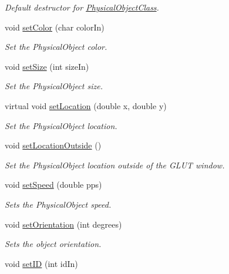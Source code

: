 \begin{DoxyCompactItemize}
\begin{DoxyCompactList}\small\item\em Default destructor for \hyperlink{classPhysicalObjectClass}{Physical\-Object\-Class}. \end{DoxyCompactList}\item 
void \hyperlink{classPhysicalObjectClass_aed8b6e0511dd981e8161eabfc6705be1}{set\-Color} (char color\-In)
\begin{DoxyCompactList}\small\item\em Set the Physical\-Object color. \end{DoxyCompactList}\item 
void \hyperlink{classPhysicalObjectClass_a02c35b30ac5f7c02d006ec0c008d7280}{set\-Size} (int size\-In)
\begin{DoxyCompactList}\small\item\em Set the Physical\-Object size. \end{DoxyCompactList}\item 
virtual void \hyperlink{classPhysicalObjectClass_a3f9833aa04aa438de63b82fc761910ba}{set\-Location} (double x, double y)
\begin{DoxyCompactList}\small\item\em Set the Physical\-Object location. \end{DoxyCompactList}\item 
void \hyperlink{classPhysicalObjectClass_ad80f075cef71fd42587695936a5808fa}{set\-Location\-Outside} ()
\begin{DoxyCompactList}\small\item\em Set the Physical\-Object location outside of the G\-L\-U\-T window. \end{DoxyCompactList}\item 
void \hyperlink{classPhysicalObjectClass_ab8315565f193dd26f7069480d820a7c9}{set\-Speed} (double pps)
\begin{DoxyCompactList}\small\item\em Sets the Physical\-Object speed. \end{DoxyCompactList}\item 
void \hyperlink{classPhysicalObjectClass_abbfc7fde25fa2fd5fe4e9a4fb1841601}{set\-Orientation} (int degrees)
\begin{DoxyCompactList}\small\item\em Sets the object orientation. \end{DoxyCompactList}\item 
void \hyperlink{classPhysicalObjectClass_a24a8cd79d7edfdd4e77518f8710560f5}{set\-I\-D} (int id\-In)

\end{DoxyCompactItemize}
